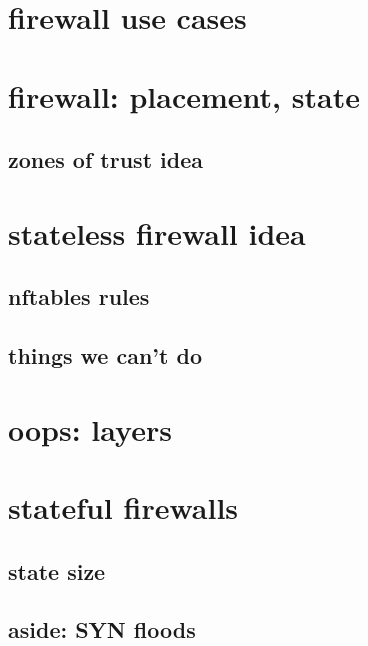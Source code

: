 \section{firewall use cases}



\section{firewall: placement, state}


\subsection{zones of trust idea}


\section{stateless firewall idea}


\subsection{nftables rules}


\subsection{things we can't do}


\section{oops: layers}


\section{stateful firewalls}


\subsection{state size}


\subsection{aside: SYN floods}


